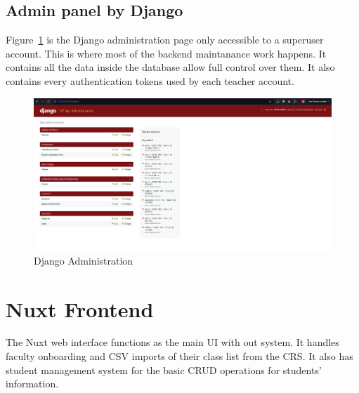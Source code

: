 \subsection{Admin panel by Django}
Figure~\ref{fig:admin} is the Django administration page only accessible to a superuser account. This is where most of the backend maintanance work happens. It contains all the data inside the database allow full control over them. It also contains every authentication tokens used by each teacher account.
\begin{figure}[h] %
	\centering
	\includegraphics[width=1\textwidth]{figures/chapter4/admin.png} %
	\caption{Django Administration}
	\label{fig:admin}
\end{figure}

\section{Nuxt Frontend}
The Nuxt web interface functions as the main UI with out system. It handles faculty onboarding and CSV imports of their class list from the CRS. It also has student management system for the basic CRUD operations for students' information.
